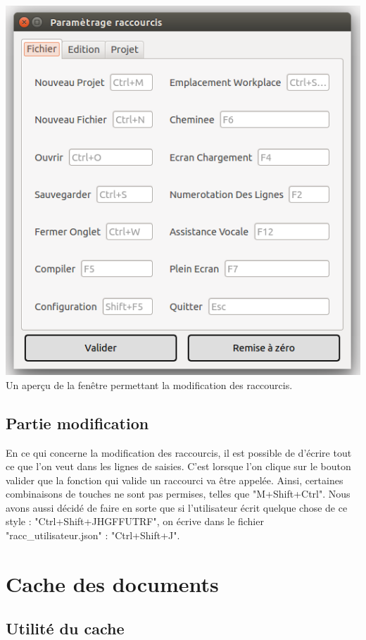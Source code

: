 \documentclass[a4paper,12pt]{article}
\begin{document}
\begin{center}
	\includegraphics[scale=0.4]{images/imgs_racc/ex_2.png}\\
	Un aperçu de la fenêtre permettant la modification des raccourcis.
\end{center}

	\subsection{Partie modification}

En ce qui concerne la modification des raccourcis, il est possible de d'écrire tout ce que l'on veut dans les lignes de saisies. C'est lorsque l'on clique sur le bouton valider que la fonction qui valide un raccourci va être appelée. Ainsi, certaines combinaisons de touches ne sont pas permises, telles que "M+Shift+Ctrl". Nous avons aussi décidé de faire en sorte que si l'utilisateur écrit quelque chose de ce style : "Ctrl+Shift+JHGFFUTRF", on écrive dans le fichier "racc\_utilisateur.json" : "Ctrl+Shift+J".

\section{Cache des documents}

	\subsection{Utilité du cache}
\end{document}
